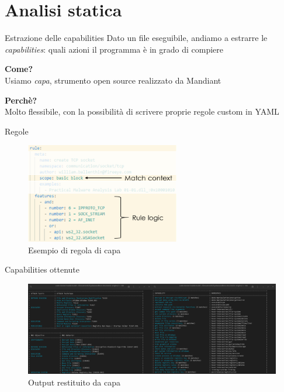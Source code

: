 \section{Analisi statica}

\begin{frame}{Estrazione delle capabilities}
Dato un file eseguibile, andiamo a estrarre le \emph{capabilities}: quali azioni il programma è in grado di compiere

\vfill

\textbf{Come?} \\
Usiamo \emph{capa}, strumento open source realizzato da Mandiant

\vfill

\textbf{Perchè?} \\
Molto flessibile, con la possibilità di scrivere proprie regole custom in YAML
\end{frame}

\begin{frame}{Regole}
\begin{figure}
    \centering
    \includegraphics[width=0.6\textwidth]{images/capa_example_rule.png}
    \caption{Esempio di regola di capa}
    \label{fig:capa_example_rule}
\end{figure}
\end{frame}

\begin{frame}{Capabilities ottenute}
\begin{figure}
    \centering
    \includegraphics[width=\textwidth]{images/capa_example_invocation.png}
    \caption{Output restituito da capa}
    \label{fig:capa_example_invocation}
\end{figure}
\end{frame}

